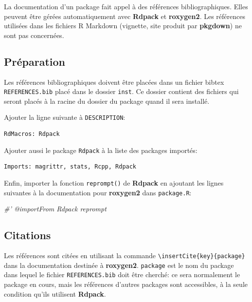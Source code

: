 \documentclass[
  12pt,
  french,
  a4paper,
  extrafontsizes,onecolumn,openright
  ]{memoir}
\newenvironment{Shaded}{\begin{snugshade}}{\end{snugshade}}
\newcommand{\CommentTok}[1]{\textcolor[rgb]{0.56,0.35,0.01}{\textit{#1}}}
\begin{document}
La documentation d'un package fait appel à des références bibliographiques.
Elles peuvent être gérées automatiquement avec \textbf{Rdpack} et \textbf{roxygen2}.
Les références utilisées dans les fichiers R Markdown (vignette, site produit par \textbf{pkgdown}) ne sont pas concernées.

\hypertarget{pruxe9paration}{%
\subsection{Préparation}\label{pruxe9paration}}

Les références bibliographiques doivent être placées dans un fichier bibtex \texttt{REFERENCES.bib} placé dans le dossier \texttt{inst}.
Ce dossier contient des fichiers qui seront placés à la racine du dossier du package quand il sera installé.

Ajouter la ligne suivante à \texttt{DESCRIPTION}:

\begin{verbatim}
RdMacros: Rdpack
\end{verbatim}

Ajouter aussi le package \texttt{Rdpack} à la liste des packages importés:

\begin{verbatim}
Imports: magrittr, stats, Rcpp, Rdpack
\end{verbatim}

Enfin, importer la fonction \texttt{reprompt()} de \textbf{Rdpack} en ajoutant les lignes suivantes à la documentation pour \textbf{roxygen2} dans \texttt{package.R}:

\scriptsize

\begin{Shaded}
\begin{Highlighting}[]
\CommentTok{#' @importFrom Rdpack reprompt}
\end{Highlighting}
\end{Shaded}

\normalsize

\hypertarget{citations}{%
\subsection{Citations}\label{citations}}

Les références sont citées en utilisant la commande \texttt{\textbackslash{}insertCite\{key\}\{package\}} dans la documentation destinée à \textbf{roxygen2}.
\texttt{package} est le nom du package dans lequel le fichier \texttt{REFERENCES.bib} doit être cherché: ce sera normalement le package en cours, mais les références d'autres packages sont accessibles, à la seule condition qu'ils utilisent \textbf{Rdpack}.
\end{document}
